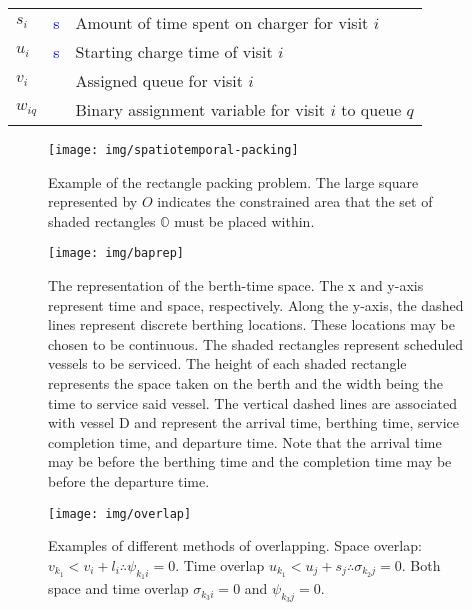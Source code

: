 \documentclass[utf8]{FrontiersinHarvard}
\begin{document}
\begin{table}[!htpb]
\begin{tabularx}{\textwidth}{l l l}
    $s_i$                    & \textcolor{blue}{s}     & Amount of time spent on charger for visit $i$                                                                     \\
    $u_i$                    & \textcolor{blue}{s}     & Starting charge time of visit $i$                                                                                 \\
    $v_i$                    &                         & Assigned queue for visit $i$                                                                                      \\
    $w_{iq}$                 &                         & Binary assignment variable for visit $i$ to queue $q$                                                             \\
    \bottomrule
  \end{tabularx}
\end{table}

\begin{figure}[htpb]
\centering
    \texttt{[image: img/spatiotemporal-packing]}
    \caption{Example of the rectangle packing problem. The large square represented by $O$ indicates the constrained
      area that the set of shaded rectangles $\mathbb{O}$ must be placed within.}
    \label{fig:packexample}
\end{figure}

\begin{figure}[ht]
\centering
    \texttt{[image: img/baprep]}
    \caption{The representation of the berth-time space. The x and y-axis represent time and space, respectively. Along
      the y-axis, the dashed lines represent discrete berthing locations. These locations may be chosen to be
      continuous. The shaded rectangles represent scheduled vessels to be serviced. The height of each shaded rectangle
      represents the space taken on the berth and the width being the time to service said vessel. The vertical dashed
      lines are associated with vessel D and represent the arrival time, berthing time, service completion time, and
      departure time. Note that the arrival time may be before the berthing time and the completion time may be before
      the departure time.}
    \label{fig:bap}
\end{figure}

\begin{figure}[htpb]
\centering
    \texttt{[image: img/overlap]}
    \caption{Examples of different methods of overlapping. Space overlap: $v_{k_1} < v_{i} + l_i \therefore \psi_{k_{1}i} = 0$.
             Time overlap $u_{k_1} < u_{j} + s_j \therefore \sigma_{k_{2}j} = 0$. Both space and time overlap $\sigma_{k_{3}i} = 0$ and
             $\psi_{k_{3}j} = 0$.}
    \label{fig:multipleassign}
\end{figure}
\end{document}
